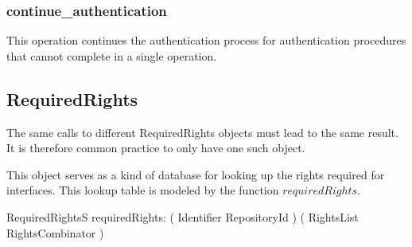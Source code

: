 \subsubsection{continue\_authentication}
This operation continues the authentication process for authentication
procedures that cannot complete in a single operation.




\subsection{RequiredRights \label{sec:RequiredRights}}

\vspace{2ex}

The same calls to different RequiredRights objects must lead to the same result.
It is therefore common practice to only have one such object.

This object serves as a kind of database for looking up the rights required for
interfaces.  This lookup table is modeled by the function $requiredRights$.
\begin{schema}{RequiredRightsS}
  requiredRights: ( Identifier \cross RepositoryId ) \pfun ( RightsList \cross
  RightsCombinator ) \\
\end{schema}


